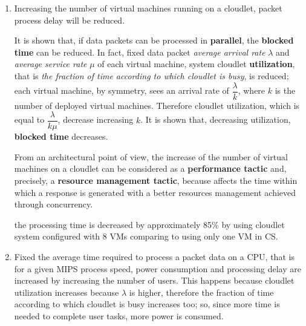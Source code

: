 \documentclass[sigchi]{acmart}
\begin{document}
\begin{enumerate}

\item Increasing the number of virtual machines running on a cloudlet, packet process delay will be reduced.

It is shown that, if data packets can be processed in \textbf{parallel}, the \textbf{blocked time} can be reduced. In fact, fixed data packet \textit{average arrival rate} $\lambda$ and \textit{average service rate} $\mu$ of each virtual machine, system cloudlet \textbf{utilization}, that is \textit{the fraction of time according to which cloudlet is busy}, is reduced; each virtual machine, by symmetry, sees an arrival rate of $\dfrac{\lambda}{k}$, where $k$ is the number of deployed virtual machines. Therefore cloudlet utilization, which is equal to $\dfrac{\lambda}{k\mu}$, decrease increasing $k$. It is shown that, decreasing utilization, \textbf{blocked time} decreases.\cite{BassSoftwareArchitecture2003}

From an architectural point of view, the increase of the number of virtual machines on a cloudlet can be considered as a \textbf{performance tactic} and, precisely, a \textbf{resource management tactic}, because affects the time within which a response is generated with a better resources management achieved through concurrency.\cite{BassSoftwareArchitecture2003}

\vspace{0.3cm}

\begin{quoting}[font=itshape, begintext={``}, endtext={''\cite[par.~3.3]{MSAReport}}]
the processing time is decreased by approximately 85\% by using cloudlet system configured with 8 VMs comparing to using only one VM in CS.
\end{quoting}

\vspace{0.3cm}

\item Fixed the average time required to process a packet data on a CPU, that is for a given MIPS process speed, power consumption and processing delay are increased by increasing the number of users. This happens because cloudlet utilization increases because $\lambda$ is higher, therefore the fraction of time according to which cloudlet is busy increases too; so, since more time is needed to complete user tasks, more power is consumed.

\end{enumerate}
\end{document}
